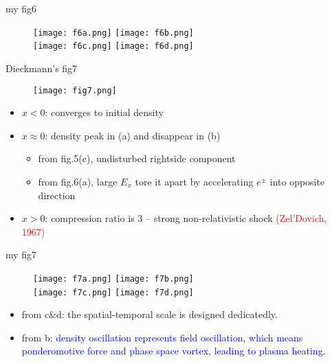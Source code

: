 \documentclass[10pt]{beamer}
\begin{document}
\begin{frame}{my fig6}
\begin{figure}
\texttt{[image: f6a.png]}
\texttt{[image: f6b.png]} \\
\texttt{[image: f6c.png]}
\texttt{[image: f6d.png]} \\
\end{figure}
\end{frame}

\begin{frame}{Dieckmann's fig7}

\begin{figure}
\texttt{[image: fig7.png]}
\end{figure}

\begin{itemize}
\item $x<0$: converges to initial density
\item $x\approx 0$: density peak in (a) and disappear in (b)
\begin{itemize}
\item from fig.5(c), undisturbed rightside component
\item from fig.6(a), large $E_x$ tore it apart by accelerating $e^{\pm}$ into opposite direction
\end{itemize}
\item $x>0$: compression ratio is 3 -- strong non-relativistic shock \textcolor{red}{(Zel'Dovich, 1967)}
\end{itemize}
\end{frame}

\begin{frame}{my fig7}
\begin{figure}
\texttt{[image: f7a.png]}
\texttt{[image: f7b.png]} \\
\texttt{[image: f7c.png]}
\texttt{[image: f7d.png]} \\
\end{figure}

\begin{itemize}
\item from c\&d: the spatial-temporal scale is designed dedicatedly.
\item from b: \textcolor{blue}{density oscillation represents field oscillation, which means ponderomotive force and phase space vortex, leading to plasma heating.}
\end{itemize}
\end{frame}
\end{document}
